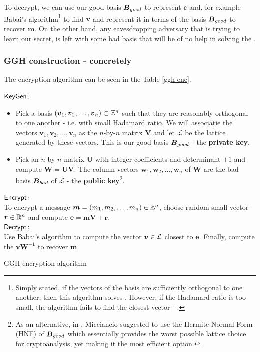 To decrypt, we can use our good basis $\boldsymbol{B}_{good}$ to represent $\bm{c}$ and, for example Babai's algorithm\footnote{Simply stated, if the vectors of the basis are sufficiently orthogonal to one another, then this algorithm solves . However, if the Hadamard ratio is too small, the algorithm fails to find the closest vector - \cite{book}.} to find $\bm{v}$ and represent it in terms of the basis $\boldsymbol{B}_{good}$ to recover $\bm{m}$. On the other hand, any eavesdropping adversary that is trying to learn our secret, is left with some bad basis that will be of no help in solving the .

\subsubsection*{GGH construction - concretely}
The encryption algorithm can be seen in the Table \ref{ggh-enc}.
\begin{table}[ht]
	\centering
	\begin{mdframed}
$\alg{KeyGen}$:
\begin{itemize}
    \item Pick a basis $(\boldsymbol{v}_1, \boldsymbol{v}_2, \dots, \boldsymbol{v}_n) \subset \mathbb{Z}^n$ such that they are reasonably orthogonal to one another - i.e. with small Hadamard ratio. We will associatie the vectors $\bm{v}_1, \bm{v}_2, \dots, \bm{v}_n$ as the $n$-by-$n$ matrix $\bm{V}$ and let $\mathcal{L}$ be the lattice generated by these vectors. This is our good basis $\boldsymbol{B}_{good}$ - the \textbf{private key}.
    \item Pick an $n$-by-$n$ matrix $\bm{U}$ with integer coefficients and determinant $\pm 1$ and compute $\bm{W} = \bm{UV}$. The column vectors $\bm{w}_1, \bm{w}_2, \dots, \bm{w}_n$ of $\bm{W}$ are the bad basis $\boldsymbol{B}_{bad}$ of $\mathcal{L}$ - the \textbf{public key}\footnote{As an alternative, in \cite{hnf}, Micciancio suggested to use the Hermite Normal Form (HNF) of $\boldsymbol{B}_{good}$ which essentially provides the worst possible lattice choice for cryptoanalysis, yet making it the most efficient option.}.
\end{itemize}
$\alg{Encrypt}$:\\
To encrypt a message $\boldsymbol{m} = (m_1, m_2, \dots, m_n) \in \mathbb{Z}^n$, choose random small vector $\boldsymbol{r} \in \mathbb{R}^n$  and compute $\bm{e} = \bm{mV} + \bm{r}$.\\
$\alg{Decrypt}$:\\
Use Babai's algorithm to compute the vector $\boldsymbol{v} \in \mathcal{L}$ closest to $\bm{e}$. Finally, compute the $\bm{vW^{-1}}$ to recover $\bm{m}$.
\end{mdframed}
\caption{GGH encryption algorithm}
\label{ggh-enc}
\end{table}



